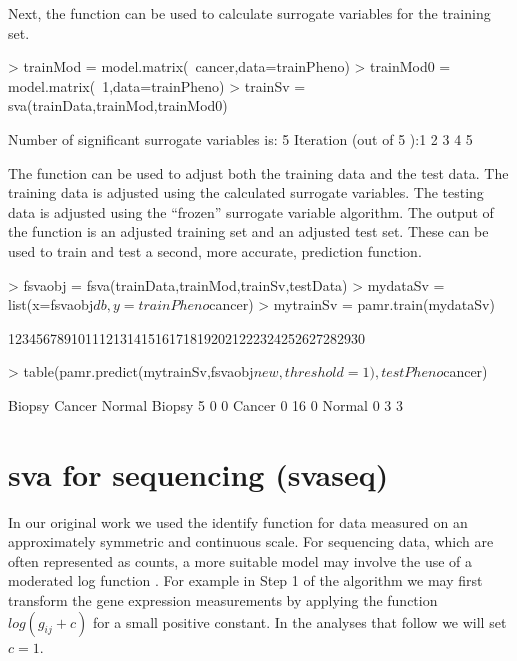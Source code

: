 \documentclass[12pt]{article}
\begin{document}
Next, the  function can be used to calculate surrogate variables for the training set.

\begin{Schunk}
\begin{Sinput}
> trainMod = model.matrix(~cancer,data=trainPheno)
> trainMod0 = model.matrix(~1,data=trainPheno)
> trainSv = sva(trainData,trainMod,trainMod0)
\end{Sinput}
\begin{Soutput}
Number of significant surrogate variables is:  5 
Iteration (out of 5 ):1  2  3  4  5  
\end{Soutput}
\end{Schunk}

The  function can be used to adjust both the training data and the test data. The training data is adjusted using the calculated surrogate variables. The testing data is adjusted using the ``frozen'' surrogate variable algorithm. The output of the  function is an adjusted training set and an adjusted test set. These can be used to train and test a second, more accurate, prediction function. 


\begin{Schunk}
\begin{Sinput}
> fsvaobj = fsva(trainData,trainMod,trainSv,testData)
> mydataSv = list(x=fsvaobj$db,y=trainPheno$cancer)
> mytrainSv = pamr.train(mydataSv)
\end{Sinput}
\begin{Soutput}
123456789101112131415161718192021222324252627282930
\end{Soutput}
\begin{Sinput}
> table(pamr.predict(mytrainSv,fsvaobj$new,threshold=1),testPheno$cancer)
\end{Sinput}
\begin{Soutput}
         Biopsy Cancer Normal
  Biopsy      5      0      0
  Cancer      0     16      0
  Normal      0      3      3
\end{Soutput}
\end{Schunk}

\section{sva for sequencing (svaseq)}

In our original work we used the identify function for data measured on an approximately symmetric and continuous scale. For sequencing data, which are often represented as counts, a more suitable model may involve the use of a moderated log function \cite{frazee2014differential,bullard2010evaluation}. For example in Step 1 of the algorithm we may first transform the gene expression measurements by applying the function $log(g_{ij} + c)$ for a small positive constant. In the analyses that follow we will set $c = 1$. 
\end{document}
